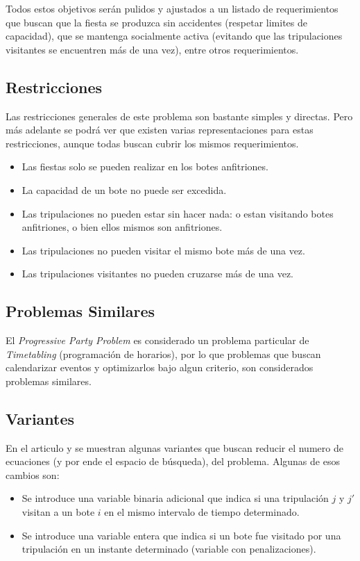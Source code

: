 \documentclass[letter, 10pt]{article}
\begin{document}
Todos estos objetivos serán pulidos y ajustados a un listado de requerimientos
que buscan que la fiesta se produzca sin accidentes (respetar limites de capacidad), que se mantenga socialmente activa (evitando que las tripulaciones visitantes se encuentren más de una vez), entre otros requerimientos.

\subsection{Restricciones}
Las restricciones generales de este problema son bastante simples y directas. Pero más adelante se podrá ver que existen varias representaciones para estas restricciones, aunque todas buscan cubrir los mismos requerimientos.

\begin{itemize}
\item Las fiestas solo se pueden realizar en los botes anfitriones.
\item La capacidad de un bote no puede ser excedida.
\item Las tripulaciones no pueden estar sin hacer nada: o estan visitando botes anfitriones, o bien ellos mismos son anfitriones.
\item Las tripulaciones no pueden visitar el mismo bote más de una vez.
\item Las tripulaciones visitantes no pueden cruzarse más de una vez.
\end{itemize}

\subsection{Problemas Similares}
El \textit{Progressive Party Problem} es considerado un problema particular de \textit{Timetabling} (programación de horarios), por lo que problemas que buscan calendarizar eventos y optimizarlos bajo algun criterio, son considerados problemas similares.

\subsection{Variantes}
En el articulo \cite{FirstPublication} y \cite{PPPAsMIP} se muestran algunas variantes que buscan reducir el numero de ecuaciones (y por ende el espacio de búsqueda), del problema. Algunas de esos cambios son:

\begin{itemize}
\item Se introduce una variable binaria adicional que indica si una tripulación $j$ y $j'$ visitan a un bote $i$ en el mismo intervalo de tiempo determinado.
\item Se introduce una variable entera que indica si un bote fue visitado por una tripulación en un instante determinado (variable con penalizaciones).
\end{itemize}
\end{document}
